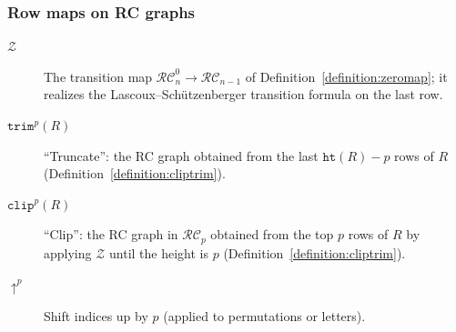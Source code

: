 \documentclass{amsart}
\theoremstyle{definition}
\theoremstyle{remark}
\numberwithin{equation}{subsection}
\newcommand{\shup}{{\uparrow}}
\newcommand{\trm}{\mathtt{trim}}
\newcommand{\zeromap}{\mathcal{Z}}
\newcommand{\hr}{\mathtt{ht}}
\newcommand{\clp}{\mathtt{clip}}
\newcommand{\RC}{\mathcal{RC}}
\begin{document}
\subsubsection*{Row maps on RC graphs}
\begin{description}
\item[$\zeromap$] The transition map $\RC_n^0\to\RC_{n-1}$ of Definition~\ref{definition:zeromap}; it realizes the Lascoux--Sch\"utzenberger transition formula on the last row.
\item[$\trm^p(R)$] ``Truncate'': the RC graph obtained from the last $\hr(R)-p$ rows of $R$ (Definition~\ref{definition:cliptrim}).
\item[$\clp^p(R)$] ``Clip'': the RC graph in $\RC_p$ obtained from the top $p$ rows of $R$ by applying $\zeromap$ until the height is $p$ (Definition~\ref{definition:cliptrim}).
\item[$\shup^p$] Shift indices up by $p$ (applied to permutations or letters).
\end{description}
\end{document}
